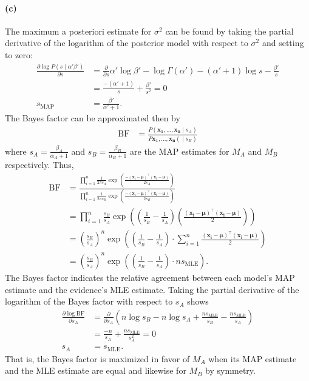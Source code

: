 \documentclass[a4paper,11pt]{article}
\DeclareMathOperator{\given}{\mid}
\begin{document}
\paragraph{(c)}
The maximum a posteriori estimate for $\sigma^2$ can be found by taking the partial derivative of the logarithm of the posterior model with respect to $\sigma^2$ and setting to zero:
\begin{align*}
\frac{\partial\log P(s\given\alpha'\beta')}{\partial s}
&=
  \frac{\partial}{\partial s}
    \alpha'\log\beta' - \log\Gamma(\alpha')
    -(\alpha'+1)\log s -\frac{\beta'}{s}\\
&=
  \frac{-(\alpha'+1)}{s} + \frac{\beta'}{s^2}=0
\\
s_\mathrm{\scriptscriptstyle{MAP}}&=\frac{\beta'}{\alpha'+1}.  
\end{align*}
The Bayes factor can be approximated then by
\begin{align*}
\mathrm{BF}&=
  \frac{
    P(\mathbf{x_1},\dots,\mathbf{x_n}\given s_A)
  }{
    P\mathbf{x_1},\dots,\mathbf{x_n}(\given s_B)
  }
\end{align*}
where $s_A=\frac{\beta_A}{\alpha_A+1}$ and $s_B=\frac{\beta_B}{\alpha_B+1}$ are the MAP estimates for $M_A$ and $M_B$ respectively. Thus,
\begin{align*}
\mathrm{BF}&=
  \frac{
    \prod_{i=1}^n
      \frac{1}{2\pi s_A}
      \exp\left(
        \frac{
          -(\mathbf{x_i}-\boldsymbol\mu)^\top(\mathbf{x_i}-\boldsymbol\mu)
        }{
          2s_A
        }
      \right)
  }{
    \prod_{i=1}^n
      \frac{1}{2\pi s_B}
      \exp\left(
        \frac{
          -(\mathbf{x_i}-\boldsymbol\mu)^\top(\mathbf{x_i}-\boldsymbol\mu)
        }{
          2s_B
        }
      \right)
  }
\\
&=
  \prod_{i=1}^n
    \frac{s_B}{s_A}
    \exp\left(
      (\frac{1}{s_B}-\frac{1}{s_A})
      (\frac{(\mathbf{x_i}-\boldsymbol\mu)^\top(\mathbf{x_i}-\boldsymbol\mu)}{2})
    \right)
\\
&=
  \left(\frac{s_B}{s_A}\right)^n
  \exp\left(
    (\frac{1}{s_B}-\frac{1}{s_A})
    \cdot\sum_{i=1}^n\frac{(\mathbf{x_i}-\boldsymbol\mu)^\top(\mathbf{x_i}-\boldsymbol\mu)}{2}
  \right)
\\
&=
  \left(\frac{s_B}{s_A}\right)^n
  \exp\left(
    (\frac{1}{s_B}-\frac{1}{s_A})
    \cdot ns_\mathrm{\scriptscriptstyle{MLE}}
  \right).
\end{align*}
The Bayes factor indicates the relative agreement between each model's MAP estimate and the evidence's MLE estimate. Taking the partial derivative of the logarithm of the Bayes factor with respect to $s_A$ shows
\begin{align*}
\frac{\partial\log\mathrm{BF}}{\partial s_A}&=
  \frac{\partial}{\partial s_A}
  \left(
    n\log s_B - n\log s_A + \frac{ns_\mathrm{\scriptscriptstyle{MLE}}}{s_B}-\frac{ns_\mathrm{\scriptscriptstyle{MLE}}}{s_A}
  \right)
\\
&=
  \frac{-n}{s_A}+\frac{ns_\mathrm{\scriptscriptstyle{MLE}}}{s_A^2}=0
\\
s_A&=s_\mathrm{\scriptscriptstyle{MLE}}.  
\end{align*}
That is, the Bayes factor is maximized in favor of $M_A$ when its MAP estimate and the MLE estimate are equal and likewise for $M_B$ by symmetry. 
\clearpage
\end{document}
